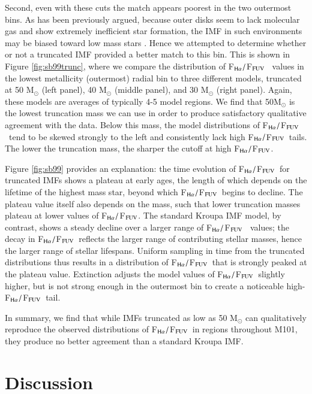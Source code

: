 \documentclass[iop]{emulateapj}
\newcommand{\hafuv}{F$_{\rm H\alpha}/$F$_{\rm FUV}$}
\begin{document}
    Second, even with these cuts the match appears poorest in the
    two outermost bins.  As has been previously argued, because outer
    disks seem to lack molecular gas and show extremely inefficient
    star formation, the IMF in such environments may be biased toward
    low mass stars \citep[e.g.][]{meurer09, pflamm09, bigiel10}.
  Hence we attempted to determine whether or not a truncated IMF
  provided a better match to this bin.  This is shown in Figure
    \ref{fig:sb99trunc}, where we compare the distribution of \hafuv
    \ values in the lowest metallicity (outermost) radial bin to three
    different models, truncated at 50 M$_{\odot}$ (left panel), 40
    M$_{\odot}$ (middle panel), and 30 M$_{\odot}$ (right panel).
    Again, these models are averages of typically 4-5 model regions.
    We find that 50M$_{\odot}$ is the lowest truncation mass we can
    use in order to produce satisfactory qualitative agreement with
    the data.  Below this mass, the model distributions of \hafuv
    \ tend to be skewed strongly to the left and consistently lack
    high \hafuv \ tails.  The lower the truncation mass, the sharper
    the cutoff at high \hafuv.

  Figure \ref{fig:sb99} provides an explanation: the time evolution of
  \hafuv \ for truncated IMFs shows a plateau at early ages, the
  length of which depends on the lifetime of the highest mass star,
  beyond which \hafuv \ begins to decline.  The plateau value itself
  also depends on the mass, such that lower truncation masses plateau
  at lower values of \hafuv.  The standard Kroupa IMF model, by
  contrast, shows a steady decline over a larger range of \hafuv
  \ values; the decay in \hafuv \ reflects the larger range of
  contributing stellar masses, hence the larger range of stellar
  lifespans.  Uniform sampling in time from the truncated
  distributions thus results in a distribution of \hafuv \ that is
  strongly peaked at the plateau value. Extinction adjusts the model
  values of \hafuv \ slightly higher, but is not strong enough in the
  outermost bin to create a noticeable high-\hafuv \ tail.

In summary, we find that while IMFs truncated as low as 50 M$_{\odot}$
can qualitatively reproduce the observed distributions of \hafuv \ in
 regions throughout M101, they produce no better
  agreement than a standard Kroupa IMF.

\section{Discussion}
\end{document}
